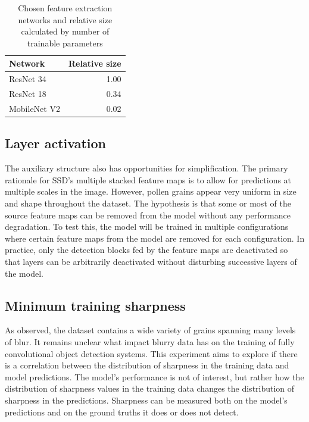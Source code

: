 \begin{table}[htbp]\centering
\caption[Feature extraction networks]{Chosen feature extraction networks and relative size calculated by number of trainable parameters}%
\label{tab:ex01}
\begin{tabular}{@{}lr@{}}\toprule
  Network & Relative size \\
  \midrule
     ResNet 34 & 1.00  \\
     ResNet 18 & 0.34  \\
  MobileNet V2 & 0.02  \\
  \bottomrule
\end{tabular}
\end{table}

\subsection{Layer activation}
The auxiliary structure also has opportunities for simplification.
The primary rationale for SSD's multiple stacked feature maps is to allow for predictions at multiple scales in the image.
However, pollen grains appear very uniform in size and shape throughout the dataset.
The hypothesis is that some or most of the source feature maps can be removed from the model without any performance degradation.
To test this, the model will be trained in multiple configurations where certain feature maps from the model are removed for each configuration.
In practice, only the detection blocks fed by the feature maps are deactivated so that layers can be arbitrarily deactivated without disturbing successive layers of the model.

\subsection{Minimum training sharpness}
As observed, the dataset contains a wide variety of grains spanning many levels of blur.
It remains unclear what impact blurry data has on the training of fully convolutional object detection systems.
This experiment aims to explore if there is a correlation between the distribution of sharpness in the training data and model predictions.
The model's performance is not of interest, but rather how the distribution of sharpness values in the training data changes the distribution of sharpness in the predictions.
Sharpness can be measured both on the model's predictions and on the ground truths it does or does not detect.

